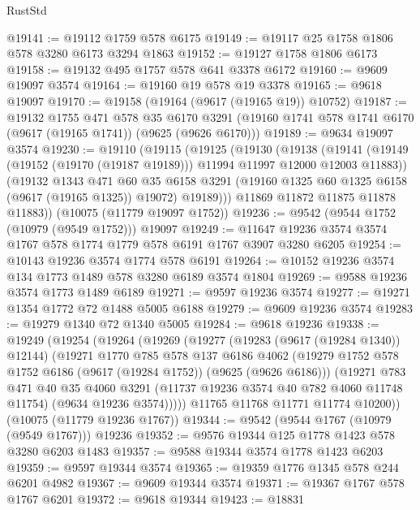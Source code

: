 \begin{lexlean}{RustStd}
\begin{coremodule}
{\begin{coremodule}
{{{{{{{{{{{{{{{{{{{{{{{{{{{{{{{{{@19141 := @19112 @1759 @578 @6175
@19149 := @19117 @25 @1758 @1806 @578 @3280 @6173 @3294 @1863
@19152 := @19127 @1758 @1806 @6173
@19158 := @19132 @495 @1757 @578 @641 @3378 @6172
@19160 := @9609 @19097 @3574
@19164 := @19160 @19 @578 @19 @3378
@19165 := @9618 @19097
@19170 := @19158 (@19164 (@9617 (@19165 @19)) @10752)
@19187 := @19132
    @1755
    @471
    @578
    @35
    @6170
    @3291
    (@19160 @1741 @578 @1741 @6170 (@9617 (@19165 @1741)) (@9625 (@9626 @6170)))
@19189 := @9634 @19097 @3574
@19230 := @19110
    (@19115
      (@19125
        (@19130
          (@19138
            (@19141 (@19149 (@19152 (@19170 (@19187 @19189))) @11994 @11997 @12000 @12003 @11883))
            (@19132
              @1343
              @471
              @60
              @35
              @6158
              @3291
              (@19160 @1325 @60 @1325 @6158 (@9617 (@19165 @1325)) @19072)
              @19189)))
        @11869
        @11872
        @11875
        @11878
        @11883))
    (@10075 (@11779 @19097 @1752))
@19236 := @9542 (@9544 @1752 (@10979 (@9549 @1752))) @19097
@19249 := @11647 @19236 @3574 @3574 @1767 @578 @1774 @1779 @578 @6191 @1767 @3907 @3280 @6205
@19254 := @10143 @19236 @3574 @1774 @578 @6191
@19264 := @10152 @19236 @3574 @134 @1773 @1489 @578 @3280 @6189 @3574 @1804
@19269 := @9588 @19236 @3574 @1773 @1489 @6189
@19271 := @9597 @19236 @3574
@19277 := @19271 @1354 @1772 @72 @1488 @5005 @6188
@19279 := @9609 @19236 @3574
@19283 := @19279 @1340 @72 @1340 @5005
@19284 := @9618 @19236
@19338 := @19249
    (@19254
      (@19264
        (@19269
          (@19277
            (@19283 (@9617 (@19284 @1340)) @12144)
            (@19271
              @1770
              @785
              @578
              @137
              @6186
              @4062
              (@19279 @1752 @578 @1752 @6186 (@9617 (@19284 @1752)) (@9625 (@9626 @6186)))
              (@19271
                @783
                @471
                @40
                @35
                @4060
                @3291
                (@11737 @19236 @3574 @40 @782 @4060 @11748 @11754)
                (@9634 @19236 @3574)))))
        @11765
        @11768
        @11771
        @11774
        @10200))
    (@10075 (@11779 @19236 @1767))
@19344 := @9542 (@9544 @1767 (@10979 (@9549 @1767))) @19236
@19352 := @9576 @19344 @125 @1778 @1423 @578 @3280 @6203 @1483
@19357 := @9588 @19344 @3574 @1778 @1423 @6203
@19359 := @9597 @19344 @3574
@19365 := @19359 @1776 @1345 @578 @244 @6201 @4982
@19367 := @9609 @19344 @3574
@19371 := @19367 @1767 @578 @1767 @6201
@19372 := @9618 @19344
@19423 := @18831
}}}}}}}}}}}}}}}}}}}}}}}}}}}}}}}}}
\end{coremodule}}
\end{coremodule}
\end{lexlean}
